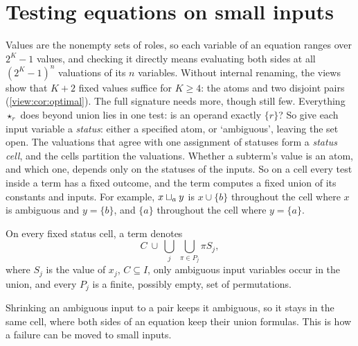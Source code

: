 \section{Testing equations on small inputs}\label{sec:pair-tests}

Values are the nonempty sets of roles, so each variable of an equation ranges over $2^K-1$ values, and checking it directly means evaluating both sides at all $(2^K-1)^n$ valuations of its $n$ variables. Without internal renaming, the views show that $K+2$ fixed values suffice for $K\geq4$: the atoms and two disjoint pairs (\cref{view:cor:optimal}). The full signature needs more, though still few. Everything $\star_r$ does beyond union lies in one test: is an operand
exactly $\{r\}$? So give each input variable a \emph{status}: either a specified atom, or `ambiguous', leaving the set open. The valuations that agree with one assignment of statuses form a \emph{status cell}, and the cells partition the valuations. Whether a subterm's value is an atom, and which one, depends only on the statuses of the inputs. So on a cell every test inside a term has a fixed outcome, and the term computes a fixed union of its constants and inputs. For example, $x\mathbin{\sqcup_{a}} y$ is $x\cup\{b\}$ throughout the cell where $x$ is ambiguous and $y=\{b\}$, and $\{a\}$ throughout the cell where $y=\{a\}$.

\begin{lemma}\label{sym:lem:provenance}
On every fixed status cell, a term denotes
\begin{equation}\label{sym:eq:provenance}
 C\ \cup\ \bigcup_j\ \bigcup_{\pi\in P_j}\pi S_j,
\end{equation}
where $S_j$ is the value of $x_j$, $C\subseteq I$, only ambiguous input variables occur in the union,
and every $P_j$ is a finite, possibly empty, set of permutations.
\end{lemma}

Shrinking an ambiguous input to a pair keeps it ambiguous, so it stays in the same cell, where both sides of an equation keep their union formulas. This is how a failure can be moved to small inputs.

